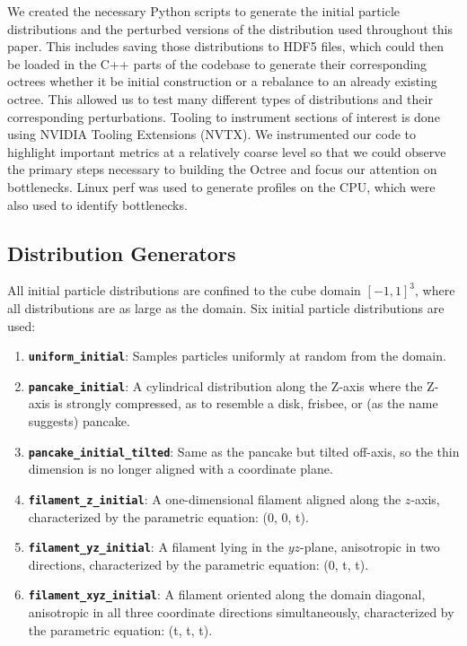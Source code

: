 We created the necessary Python scripts to generate the initial particle distributions and the perturbed versions of the distribution used throughout this paper. This includes saving those distributions to HDF5 files, which could then be loaded in the C++ parts of the codebase to generate their corresponding octrees whether it be initial construction or a rebalance to an already existing octree. This allowed us to test many different types of distributions and their corresponding perturbations. Tooling to instrument sections of interest is done using NVIDIA Tooling Extensions (NVTX). We instrumented our code to highlight important metrics at a relatively coarse level so that we could observe the primary steps necessary to building the Octree and focus our attention on bottlenecks. Linux perf was used to generate profiles on the CPU, which were also used to identify bottlenecks.

\subsection{Distribution Generators}
All initial particle distributions are confined to the cube domain $[-1,1]^3$, where all distributions are as large as the domain.
Six initial particle distributions are used:

\begin{enumerate}
    \item \textbf{\texttt{uniform\_initial}}: Samples particles uniformly at random from the domain.
    \item \textbf{\texttt{pancake\_initial}}: A cylindrical distribution along the Z-axis where the Z-axis is strongly compressed, as to resemble a disk, frisbee, or (as the name suggests) pancake.
    \item \textbf{\texttt{pancake\_initial\_tilted}}: Same as the pancake but tilted off-axis, so the thin dimension is no longer aligned with a coordinate plane.
    \item \textbf{\texttt{filament\_z\_initial}}: A one-dimensional filament aligned along the $z$-axis, characterized by the parametric equation: (0, 0, t).
    \item \textbf{\texttt{filament\_yz\_initial}}: A filament lying in the $yz$-plane, anisotropic in two directions, characterized by the parametric equation: (0, t, t).
    \item \textbf{\texttt{filament\_xyz\_initial}}: A filament oriented along the domain diagonal, anisotropic in all three coordinate directions simultaneously, characterized by the parametric equation: (t, t, t).
\end{enumerate}


